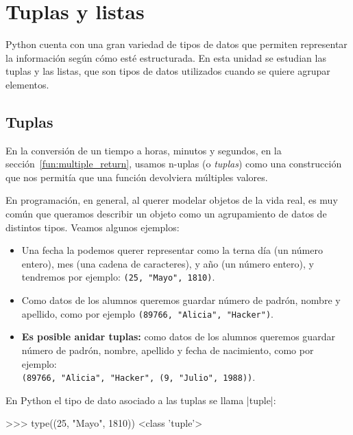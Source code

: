 \chapter{Tuplas y listas}

Python cuenta con una gran variedad de tipos de datos que permiten
representar la información según cómo esté estructurada.  En esta unidad se
estudian las tuplas y las listas, que son tipos de datos utilizados cuando
se quiere agrupar elementos.

\section{Tuplas}

En la conversión de un tiempo a horas, minutos y segundos, en la
sección~\ref{fun:multiple_return}, usamos n-uplas (o \emph{tuplas}) como una
construcción que nos permitía que una función devolviera múltiples valores.

En programación, en general, al querer modelar objetos de la vida real, es
muy común que queramos describir un objeto como un agrupamiento de datos
de distintos tipos. Veamos algunos ejemplos:

\begin{itemize}

\item Una fecha la podemos querer representar como la terna día (un número
entero), mes (una cadena de caracteres), y año (un número entero), y
tendremos por ejemplo: \lstinline!(25, "Mayo", 1810)!.

\item Como datos de los alumnos queremos guardar número de padrón, nombre y
apellido, como por ejemplo \lstinline!(89766, "Alicia", "Hacker")!.

\item {\bf Es posible anidar tuplas:} como datos de los alumnos
queremos guardar número de padrón, nombre, apellido y fecha de nacimiento,
como por ejemplo: \\
\lstinline!(89766, "Alicia", "Hacker", (9, "Julio", 1988))!.
\end{itemize}

\begin{observacion}
En Python el tipo de dato asociado a las tuplas se llama |tuple|:

\begin{codigo-python-sn}
>>> type((25, "Mayo", 1810))
<class 'tuple'>
\end{codigo-python-sn}
\end{observacion}

